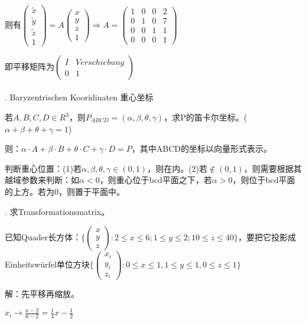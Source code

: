 \documentclass[fleqn]{article}
\begin{document}
则有$\begin{pmatrix}
    \tilde{x}\\\tilde{y}\\\tilde{z}\\1
\end{pmatrix}=A\begin{pmatrix}
    x\\y\\z\\1
\end{pmatrix}\Rightarrow A=\begin{pmatrix}
    1&0&0&2\\
    0&1&0&7\\
    0&0&1&1\\
    0&0&0&1
\end{pmatrix}$

即平移矩阵为$\begin{pmatrix}
    I&Verschiebung\\
    0&1
\end{pmatrix}$
\\
\\
. Baryzentrischen Kooridinaten 重心坐标

若$A,B,C,D \in R^3$，则$P_{ABCD}=(\alpha,\beta,\theta,\gamma)$，求P的笛卡尔坐标。($\alpha+\beta+\theta+\gamma=1$)

则：$\alpha\cdot A+\beta\cdot B + \theta\cdot C + \gamma\cdot D = P$，其中ABCD的坐标以向量形式表示。

判断重心位置：(1)若$\alpha,\beta,\theta,\gamma\in(0,1)$，则在内。(2)若$\notin (0,1)$，则需要根据其越域参数来判断：如$\alpha<0$，则重心位于bcd平面之下，若$\alpha>0$，则位于bcd平面的上方。若为0，则置于平面中。

. 求Transformationsmatrix。

已知Quader长方体：$\{\begin{pmatrix}
    x\\y\\z
\end{pmatrix}:2\leq x\leq6;1\leq y\leq 2;10\leq z\leq 40\}$，要把它投影成Einheitswürfel单位方块$\{\begin{pmatrix}
    x_i\\y_i\\z_i
\end{pmatrix}:0\leq x\leq 1, 1\leq y\leq 1, 0\leq z \leq 1\}$

解：先平移再缩放。

$x_i \rightarrow \frac{x-2}{6-2} = \frac{1}{4}x-\frac{1}{2}$
\end{document}

